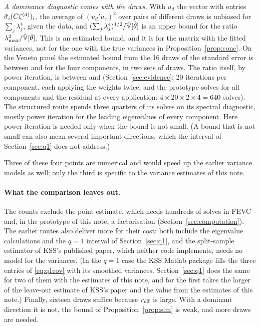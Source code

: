 \emph{A dominance diagnostic comes with the draws.} With $u_d$ the vector with entries $\tilde\sigma_i(C\zeta^{(d)})_i$,
the average of $(u_d'u_e)^2$ over pairs of different draws is unbiased for $\sum_j\lambda_j^4$, given the data,
and $(\sum_j\lambda_j^4)^{1/2}/\hat{\mathbb{V}}[\hat\theta]$ is an upper bound for the ratio
$\lambda_{\max}^2/\hat{\mathbb{V}}[\hat\theta]$. This is an estimated bound, and it is for the matrix with the fitted
variances, not for the one with the true variances in Proposition~\ref{prop:conc}. On the Veneto panel the estimated bound from the 16 draws of the standard error is between
 and  for the four components, in two sets of draws. The ratio itself, by power
iteration, is between  and  (Section~\ref{sec:evidence}; 20 iterations per
component, each applying the weights twice, and the prototype solves for all components and the residual at
every application: $4\times20\times2\times4=640$ solves). The structured route spends three quarters of its solves on its spectral diagnostic, mostly power iteration
for the leading eigenvalues of every component. Here power iteration is needed only when the bound is not
small. (A bound that is not small can also mean several important directions, which the interval of
Section~\ref{sec:q1} does not address.)

Three of these four points are numerical and would speed up the earlier variance models as well; only the
third is specific to the variance estimates of this note.

\paragraph{What the comparison leaves out.} The counts exclude the point estimate, which needs hundreds of
solves in FEVC and, in the prototype of this note, a factorisation (Section~\ref{sec:computation}). The earlier
routes also deliver more for their cost: both include the eigenvalue calculations and the $q=1$ interval of
Section~\ref{sec:q1}, and the split-sample estimator of KSS's published paper, which neither code implements, needs no model
for the variances. (In the $q=1$ case the KSS Matlab package fills the three entries of \eqref{eq:q1cov} with
its smoothed variances. Section~\ref{sec:q1} does the same for two of them with the estimates of this note, and
for the first takes the larger of the leave-out estimate of KSS's paper and the value from the estimates of
this note.) Finally, sixteen draws suffice
because $r_{\rm eff}$ is large. With a dominant direction it is not, the bound of Proposition~\ref{prop:sim}
is weak, and more draws are needed.
